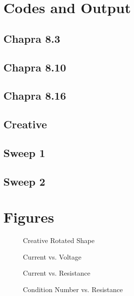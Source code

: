 \documentclass{article}
\begin{document}
\pagebreak
\appendix
\section{Codes and Output}

\lstset{style=python103, language=python}

\subsection{Chapra 8.3}
%
\subsection{Chapra 8.10}
%
\subsection{Chapra 8.16}
%
\subsection{Creative}
%
\subsection{Sweep 1}
%
\subsection{Sweep 2}
%

\pagebreak
\section{Figures}

\begin{figure}[htb!]
\begin{center}
\caption{Creative Rotated Shape}
\end{center}
\end{figure}

\begin{figure}[htb!]
\begin{center}
\caption{Current vs. Voltage}
\end{center}
\end{figure}

\begin{figure}[htb!]
\begin{center}
\caption{Current vs. Resistance}
\end{center}
\end{figure}

\begin{figure}[htb!]
\begin{center}
\caption{Condition Number vs. Resistance}
\end{center}
\end{figure}
\end{document}
